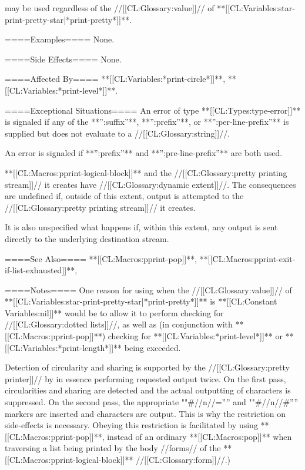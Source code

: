  may be used regardless of the //[[CL:Glossary:value]]// of **[[CL:Variables:star-print-pretty-star|*print-pretty*]]**.

====Examples====
None.

====Side Effects====
None.

====Affected By====
**[[CL:Variables:*print-circle*]]**, **[[CL:Variables:*print-level*]]**.

====Exceptional Situations====
An error of type **[[CL:Types:type-error]]** is signaled if any of the **'':suffix''**, **'':prefix''**, or **'':per-line-prefix''** is supplied but does not evaluate to a //[[CL:Glossary:string]]//.

An error is signaled if **'':prefix''** and **'':pre-line-prefix''** are both used.

**[[CL:Macros:pprint-logical-block]]** and the //[[CL:Glossary:pretty printing stream]]// it creates have //[[CL:Glossary:dynamic extent]]//. The consequences are undefined if, outside of this extent, output is attempted to the //[[CL:Glossary:pretty printing stream]]// it creates.

It is also unspecified what happens if, within this extent, any output is sent directly to the underlying destination stream.

====See Also====
**[[CL:Macros:pprint-pop]]**, **[[CL:Macros:pprint-exit-if-list-exhausted]]**, {\secref\TildeLessThanLogicalBlock}

====Notes====
One reason for using  when the //[[CL:Glossary:value]]// of **[[CL:Variables:star-print-pretty-star|*print-pretty*]]** is **[[CL:Constant Variables:nil]]** would be to allow it to perform checking for //[[CL:Glossary:dotted lists]]//, as well as (in conjunction with **[[CL:Macros:pprint-pop]]**) checking for **[[CL:Variables:*print-level*]]** or **[[CL:Variables:*print-length*]]** being exceeded.

Detection of circularity and sharing is supported by the //[[CL:Glossary:pretty printer]]// by in essence performing requested output twice. On the first pass, circularities and sharing are detected and the actual outputting of characters is suppressed. On the second pass, the appropriate ""#//n//='''' and ""#//n//#'''' markers are inserted and characters are output. This is why the restriction on side-effects is necessary. Obeying this restriction is facilitated by using **[[CL:Macros:pprint-pop]]**, instead of an ordinary **[[CL:Macros:pop]]** when traversing a list being printed by the body //forms// of the **[[CL:Macros:pprint-logical-block]]** //[[CL:Glossary:form]]//.)

    
